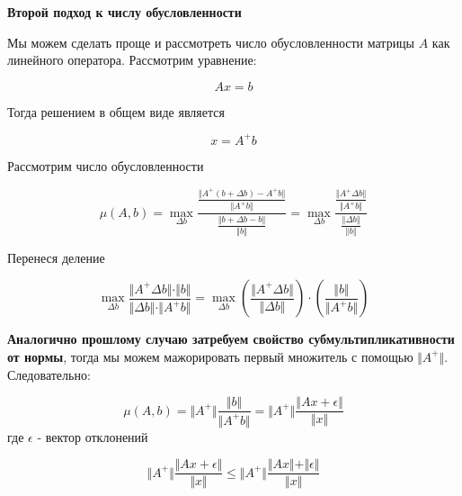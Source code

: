 \documentclass{article}
\begin{document}
    \quad

    \textbf{Второй подход к числу обусловленности}

    \quad

    Мы можем сделать проще и рассмотреть число обусловленности матрицы $A$ как линейного оператора.
    Рассмотрим уравнение:

    \begin{equation}
        Ax = b
    \end{equation}

    Тогда решением в общем виде является

    \begin{equation}
        x = A^{+} b
    \end{equation}

    Рассмотрим число обусловленности

    \begin{equation}
        \mu(A, b) = \max_{\Delta b} \frac{ \frac{\Vert A^{+} (b + \Delta b) - A^{+} b \Vert}{ \Vert A^{+} b \Vert } }{ \frac{\Vert b + \Delta b - b \Vert}{\Vert b \Vert} } =
        \max_{\Delta b} \frac{ \frac{\Vert A^{+} \Delta b \Vert}{ \Vert A^{+} b \Vert } }{ \frac{\Vert \Delta b \Vert}{\Vert b \Vert} }
    \end{equation}

    Перенеся деление

    \begin{equation}
        \max_{\Delta b} \frac{ \Vert A^{+} \Delta b \Vert \cdot  \Vert b \Vert   }{ \Vert \Delta b \Vert \cdot  \Vert A^{+} b \Vert } =
        \max_{\Delta b} (\frac{\Vert A^{+} \Delta b \Vert}{\Vert \Delta b \Vert}) \cdot (\frac{\Vert b \Vert }{\Vert A^{+} b \Vert})
    \end{equation}

    \textbf{Аналогично прошлому случаю затребуем свойство субмультипликативности от нормы}, тогда мы можем мажорировать первый множитель
    с помощью $\Vert A^{+} \Vert$.
    Следовательно:

    \begin{equation}
        \mu(A, b) = \Vert A^{+} \Vert \frac{\Vert b \Vert }{\Vert A^{+} b \Vert} = \Vert A^{+} \Vert \frac{\Vert Ax + \epsilon \Vert }{\Vert x \Vert}
    \end{equation}
    где $\epsilon$ - вектор отклонений

    \begin{equation}
        \Vert A^{+} \Vert \frac{\Vert Ax + \epsilon \Vert }{\Vert x \Vert} \leq \Vert A^{+} \Vert \frac{\Vert Ax \Vert + \Vert \epsilon \Vert }{\Vert x \Vert}
    \end{equation}
\end{document}
